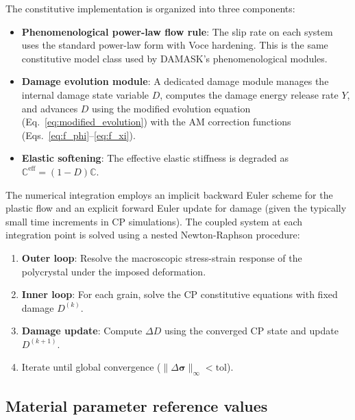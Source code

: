 \documentclass[12pt,a4paper,twocolumn]{article}
\begin{document}
The constitutive implementation is organized into three components:

\begin{itemize}
    \item \textbf{Phenomenological power-law flow rule}: The slip rate on each system uses the standard power-law form with Voce hardening. This is the same constitutive model class used by DAMASK's phenomenological modules.

    \item \textbf{Damage evolution module}: A dedicated damage module manages the internal damage state variable $D$, computes the damage energy release rate $Y$, and advances $D$ using the modified evolution equation (Eq.~\ref{eq:modified_evolution}) with the AM correction functions (Eqs.~\ref{eq:f_phi}--\ref{eq:f_xi}).

    \item \textbf{Elastic softening}: The effective elastic stiffness is degraded as $\mathbb{C}^{\text{eff}} = (1-D)\mathbb{C}$.
\end{itemize}

The numerical integration employs an implicit backward Euler scheme for the plastic flow and an explicit forward Euler update for damage (given the typically small time increments in CP simulations). The coupled system at each integration point is solved using a nested Newton-Raphson procedure:

\begin{enumerate}\def\labelenumi{(\arabic{enumi})}
    \item \textbf{Outer loop}: Resolve the macroscopic stress-strain response of the polycrystal under the imposed deformation.
    \item \textbf{Inner loop}: For each grain, solve the CP constitutive equations with fixed damage $D^{(k)}$.
    \item \textbf{Damage update}: Compute $\Delta D$ using the converged CP state and update $D^{(k+1)}$.
    \item Iterate until global convergence ($\|\Delta\boldsymbol{\sigma}\|_\infty < \text{tol}$).
\end{enumerate}

\subsection{Material parameter reference values}
\end{document}
